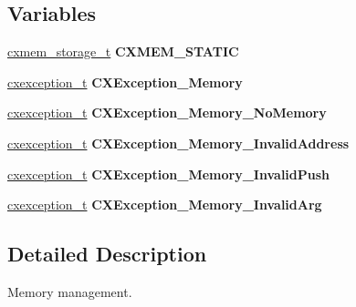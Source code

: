 \subsection*{Variables}
\begin{DoxyCompactItemize}
\item 
\mbox{\label{a00017_a7615933cf4e71b063bbd553a2aa11de2}} 
\hyperlink{a00056}{cxmem\+\_\+storage\+\_\+t} {\bfseries C\+X\+M\+E\+M\+\_\+\+S\+T\+A\+T\+IC}
\item 
\mbox{\label{a00017_a6e340b69c4d8beb1239b069f21829db6}} 
\hyperlink{a00048}{cxexception\+\_\+t} {\bfseries C\+X\+Exception\+\_\+\+Memory}
\item 
\mbox{\label{a00017_aec270a4fea4eedbfc32521b662268983}} 
\hyperlink{a00048}{cxexception\+\_\+t} {\bfseries C\+X\+Exception\+\_\+\+Memory\+\_\+\+No\+Memory}
\item 
\mbox{\label{a00017_a062da6eb8e13def13e9519836f17c50a}} 
\hyperlink{a00048}{cxexception\+\_\+t} {\bfseries C\+X\+Exception\+\_\+\+Memory\+\_\+\+Invalid\+Address}
\item 
\mbox{\label{a00017_ac4706b050a8612db9e7c45ed2eceff0f}} 
\hyperlink{a00048}{cxexception\+\_\+t} {\bfseries C\+X\+Exception\+\_\+\+Memory\+\_\+\+Invalid\+Push}
\item 
\mbox{\label{a00017_a7862241f43b7647161f4c69a60ed2a18}} 
\hyperlink{a00048}{cxexception\+\_\+t} {\bfseries C\+X\+Exception\+\_\+\+Memory\+\_\+\+Invalid\+Arg}
\end{DoxyCompactItemize}


\subsection{Detailed Description}
Memory management. 

